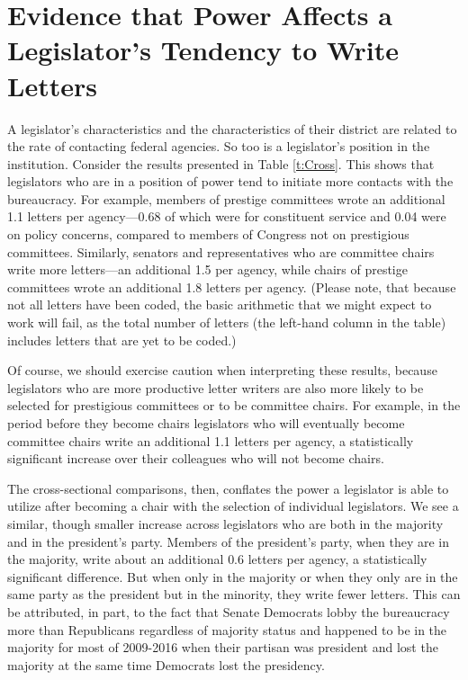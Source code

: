 \documentclass{article}
\begin{document}
\section{Evidence that Power Affects a Legislator's Tendency to Write Letters}




A legislator's characteristics and the characteristics of their district are related to the rate of contacting federal agencies.  So too is a legislator's position in the institution.  Consider the results presented in Table \ref{t:Cross}.  This shows that legislators who are in a position of power tend to initiate more contacts with the bureaucracy.  For example, members of prestige committees wrote an additional 1.1 letters per agency---0.68 of which were for constituent service and 0.04 were on policy concerns, compared to members of Congress not on prestigious committees.  Similarly, senators and representatives who are committee chairs write more letters---an additional 1.5 per agency, while chairs of prestige committees wrote an additional 1.8 letters per agency.  (Please note, that because not all letters have been coded, the basic arithmetic that we might expect to work will fail, as the total number of letters (the left-hand column in the table) includes letters that are yet to be coded.)

Of course, we should exercise caution when interpreting these results, because legislators who are more productive letter writers are also more likely to be selected for prestigious committees or to be committee chairs.  For example, in the period before they become chairs legislators who will eventually become committee chairs write an additional 1.1 letters per agency, a statistically significant increase over their colleagues who will not become chairs.  

The cross-sectional comparisons, then, conflates the power a legislator is able to utilize after becoming a chair with the selection of individual legislators.  We see a similar, though smaller increase across legislators who are both in the majority and in the president's party.  Members of the president's party, when they are in the majority, write about an additional 0.6 letters per agency, a statistically significant difference.  But when only in the majority or when they only are in the same party as the president but in the minority, they write fewer letters.  This can be attributed, in part, to the fact that Senate Democrats lobby the bureaucracy more than Republicans regardless of majority status and happened to be in the majority for most of 2009-2016 when their partisan was president and lost the majority at the same time Democrats lost the presidency. 
\end{document}
